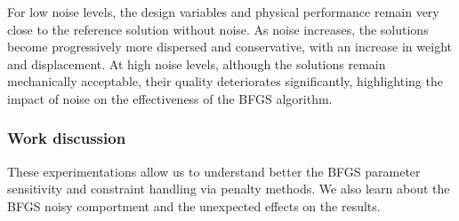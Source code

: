 \begin{table}[H]
    \centering
    \caption{Noise exploration results}
    \label{tab:truss_noise_exp}
\end{table}

For low noise levels, the design variables and physical performance remain very close to the reference solution without noise. As noise increases, the solutions become progressively more dispersed and conservative, with an increase in weight and displacement. At high noise levels, although the solutions remain mechanically acceptable, their quality deteriorates significantly, highlighting the impact of noise on the effectiveness of the BFGS algorithm.

\subsubsection{Work discussion}
These experimentations allow us to understand better the BFGS parameter sensitivity and constraint handling via penalty methods. We also learn about the BFGS noisy comportment and the unexpected effects on the results.


